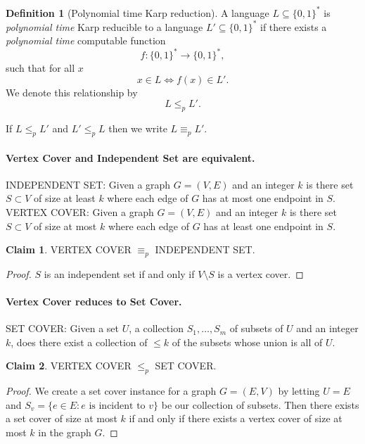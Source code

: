 \documentclass[11pt,a4paper]{article}
\theoremstyle{definition}
\newtheorem{claim}{Claim}
\newtheorem{defn}{Definition}
\begin{document}
\begin{defn}[Polynomial time Karp reduction]
A language $L\subseteq\{0,1\}^*$ is \emph{polynomial time} Karp reducible to a language $L'\subseteq \{0,1\}^*$ if there exists a \emph{polynomial time} computable function 
\[
f\colon \{0,1\}^* \to \{0,1\}^*,
\]
such that for all $x$ 
\[
x\in L \iff f(x) \in L'.
\]
We denote this relationship by 
\[
L\le_p L'.
\]

If $L\le_p L'$ and $L'\le_p L$ then we write $L\equiv_p L'$.
\end{defn}

\paragraph{Vertex Cover and Independent Set are equivalent.}
INDEPENDENT SET: Given a graph $G = (V,E)$ and an integer $k$ is there set $S\subset V$ of size at least $k$ where each edge of $G$ has at most one endpoint in $S$.\\
VERTEX COVER: Given a graph $G = (V,E)$ and an integer $k$ is there set $S\subset V$ of size at most $k$ where each edge of $G$ has at least one endpoint in $S$.

\begin{claim}
VERTEX COVER $\equiv_p$ INDEPENDENT SET.
\end{claim}
\begin{proof}
$S$ is an independent set if and only if $V\setminus S$ is a vertex cover.
\end{proof}

\paragraph{Vertex Cover reduces to Set Cover.}
SET COVER: Given a set $U$, a collection $S_1,\ldots,S_m$ of subsets of $U$ and an integer $k$, does there exist a collection of $\le k$ of the subsets whose union is all of $U$.
\begin{claim}
VERTEX COVER $\le_p$ SET COVER.
\end{claim}
\begin{proof}
We create a set cover instance for a graph $G = (E,V)$ by letting $U = E$ and $S_v = \{e\in E : e \text{ is incident to } v\}$ be our collection of subsets.
Then there exists a set cover of size at most $k$ if and only if there exists a vertex cover of size at most $k$ in the graph $G$.
\end{proof}
\end{document}
